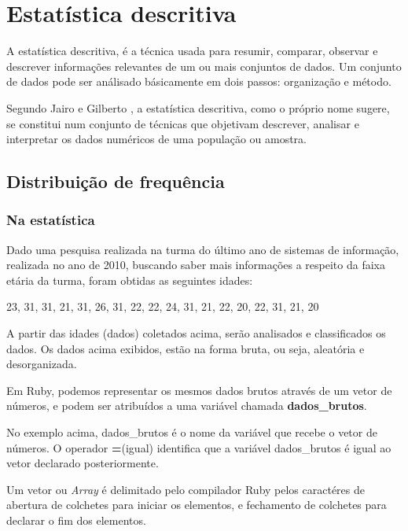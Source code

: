 \documentclass[espaco=simples,appendix=Name]{abnt}
\newcommand{\code}[1] {\textbf{#1}}
\begin{document}
\chapter{Estatística descritiva}

A estatística descritiva, é a técnica usada para resumir, comparar, observar e descrever informações relevantes de um ou mais conjuntos de dados. Um conjunto de dados pode ser análisado básicamente em dois passos: organização e método.

Segundo Jairo e Gilberto \cite{cursoEstatistica}, a estatística descritiva, como o próprio nome sugere, se constitui num conjunto de técnicas que objetivam descrever, analisar e interpretar os dados numéricos de uma população ou amostra.


\section{ Distribuição de frequência } 

\subsection { Na estatística }
Dado uma pesquisa realizada na turma do último ano de sistemas de informação, realizada no ano de 2010, buscando saber mais informações a respeito da faixa etária da turma, foram obtidas as seguintes idades:

23, 31, 31, 21, 31, 26, 31, 22, 22, 24, 31, 21, 22, 20, 22, 31, 21, 20

A partir das idades (dados) coletados acima, serão analisados e classificados os dados. Os dados acima exibidos, estão na forma bruta, ou seja, aleatória e desorganizada. 



Em Ruby, podemos representar os mesmos dados brutos através de um vetor de números, e podem ser atribuídos a uma variável chamada \code{dados\_brutos}.


 


No exemplo acima, dados\_brutos é o nome da variável que recebe o vetor de números. O operador \code{=}(igual) identifica que a variável dados\_brutos é igual ao vetor declarado posteriormente.

Um vetor ou \textit{Array} é delimitado pelo compilador Ruby pelos caractéres de abertura de colchetes para iniciar os elementos, e fechamento de colchetes para declarar o fim dos elementos.
\end{document}
